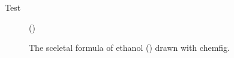 \documentclass{article}
\newcommand*\pkg[1]{\textsf{#1}}
\begin{document}
Test
\begin{figure}
  \centering
{}

()\par
  \caption{The sceletal formula of ethanol () drawn with
    \pkg{chemfig}.}
  \label{fig:ethanol}
\end{figure}
\end{document}
